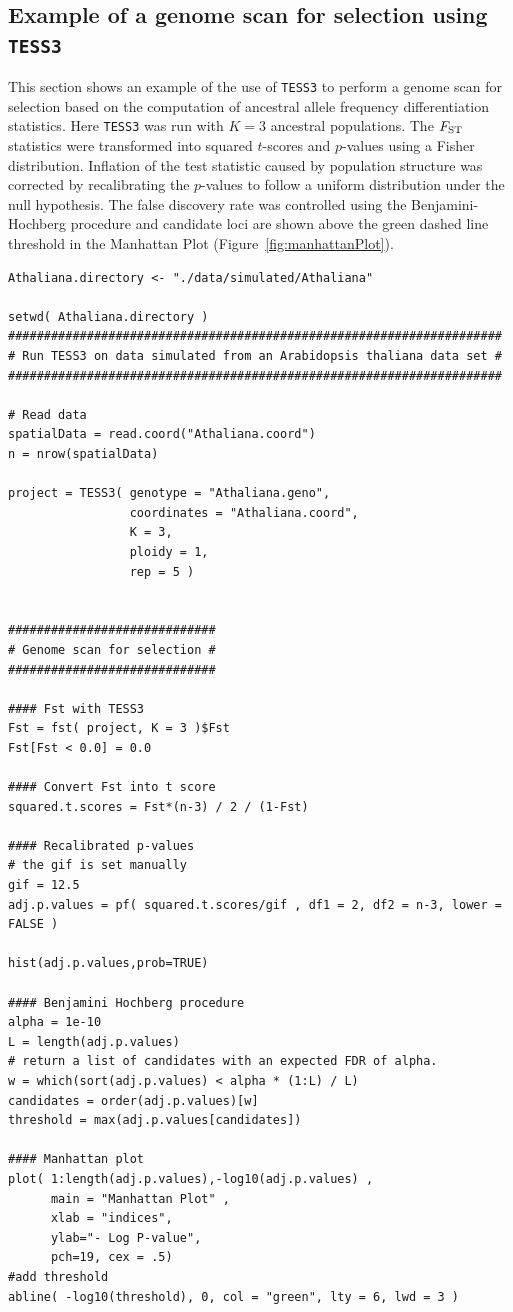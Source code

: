 \documentclass[10pt,a4paper]{article}
\begin{document}
\subsection{Example of a genome scan for selection using {\tt TESS3}}\label{sec:sel}
This section shows an example of the use of {\tt TESS3} to perform a genome scan for selection based on the computation of ancestral allele frequency differentiation statistics. Here {\tt TESS3} was run with $K = 3$ ancestral populations. The $F_{\rm ST}$ statistics were transformed into squared $t$-scores and $p$-values using a Fisher distribution. Inflation of the test statistic caused by population structure was corrected by recalibrating the $p$-values to follow a uniform distribution under the null hypothesis. The false discovery rate was controlled using the Benjamini-Hochberg procedure and candidate loci are shown above the green dashed line threshold in the Manhattan Plot (Figure~\ref{fig:manhattanPlot}).


\newpage

\begin{Verbatim}[frame=single]
Athaliana.directory <- "./data/simulated/Athaliana"

setwd( Athaliana.directory )
#####################################################################
# Run TESS3 on data simulated from an Arabidopsis thaliana data set #
#####################################################################

# Read data
spatialData = read.coord("Athaliana.coord")
n = nrow(spatialData)

project = TESS3( genotype = "Athaliana.geno", 
                 coordinates = "Athaliana.coord", 
                 K = 3, 
                 ploidy = 1, 
                 rep = 5 )


#############################
# Genome scan for selection #
#############################

#### Fst with TESS3 
Fst = fst( project, K = 3 )$Fst
Fst[Fst < 0.0] = 0.0

#### Convert Fst into t score
squared.t.scores = Fst*(n-3) / 2 / (1-Fst)

#### Recalibrated p-values
# the gif is set manually 
gif = 12.5
adj.p.values = pf( squared.t.scores/gif , df1 = 2, df2 = n-3, lower = FALSE )

hist(adj.p.values,prob=TRUE)

#### Benjamini Hochberg procedure
alpha = 1e-10
L = length(adj.p.values)
# return a list of candidates with an expected FDR of alpha.
w = which(sort(adj.p.values) < alpha * (1:L) / L)
candidates = order(adj.p.values)[w]
threshold = max(adj.p.values[candidates])

#### Manhattan plot 
plot( 1:length(adj.p.values),-log10(adj.p.values) , 
      main = "Manhattan Plot" , 
      xlab = "indices", 
      ylab="- Log P-value", 
      pch=19, cex = .5) 
#add threshold
abline( -log10(threshold), 0, col = "green", lty = 6, lwd = 3 )
\end{Verbatim}
\end{document}
